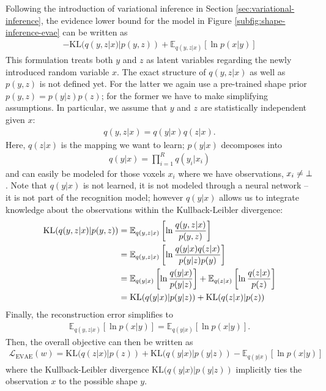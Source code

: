 Following the introduction of variational inference in Section \ref{sec:variational-inference},
the evidence lower bound for the model in Figure \ref{subfig:shape-inference-evae} can be
written as
\begin{align}
  - \text{KL}(q(y,z|x)|p(y,z)) + \mathbb{E}_{q(y,z|x)}[\ln p(x|y)]
\end{align}
This formulation treats both $y$ and $z$ as latent variables regarding the
newly introduced random variable $x$. The exact structure of $q(y,z|x)$ as well
as $p(y,z)$ is not defined yet. For the latter we again use a pre-trained shape prior
$p(y,z) = p(y|z) p(z)$; for the former we have to make simplifying assumptions.
In particular, we assume that $y$ and $z$ are statistically independent given $x$:
\begin{align}
  q(y, z | x) = q(y | x) q(z | x).
\end{align}
Here, $q(z | x)$ is the mapping we want to learn; $p(y | x)$ decomposes into
\begin{align}
  q(y | x) = \prod_{i = 1}^R q(y_i | x_i)
\end{align}
and can easily be modeled for those voxels $x_i$ where we have observations, \ie
$x_i \neq \bot$. Note that $q(y | x)$ is not learned, \ie it is
not modeled through a neural network -- it is not part of the recognition model;
however $q(y | x)$ allows us to integrate
knowledge about the observations within the Kullback-Leibler divergence:
\begin{align}
  \text{KL}(q(y,z|x)|p(y,z)) &= \mathbb{E}_{q(y, z | x)}\left[\ln\frac{q(y, z | x)}{p(y, z)}\right]\\
  &= \mathbb{E}_{q(y, z | x)}\left[\ln\frac{q(y | x)q(z | x)}{p(y | z)p(y)}\right]\\
  &= \mathbb{E}_{q(y | x)}\left[\ln\frac{q(y | x)}{p(y | z)}\right] + \mathbb{E}_{q(z | x)}\left[\ln\frac{q(z | x)}{p(z)}\right]\\
  &= \mathrm{KL}(q(y|x) | p(y|z)) + \mathrm{KL}(q(z|x)|p(z))
\end{align}
Finally, the reconstruction error simplifies to
\begin{align}
  \mathbb{E}_{q(y,z|x)}[\ln p(x|y)] = \mathbb{E}_{q(y|x)}[\ln p(x|y)].
\end{align}
Then, the overall objective can then be written as
\begin{align}
  \mathcal{L}_{\text{EVAE}}(w) = \text{KL}(q(z | x)|p(z)) + \text{KL}(q(y | x)|p(y | z)) 
  - \mathbb{E}_{q(y | x)}[\ln p(x | y)]
  \label{eq:shape-inference-evae}
\end{align}
where the Kullback-Leibler divergence $\text{KL}(q(y | x)|p(y | z))$ implicitly
ties the observation $x$ to the possible shape $y$.

